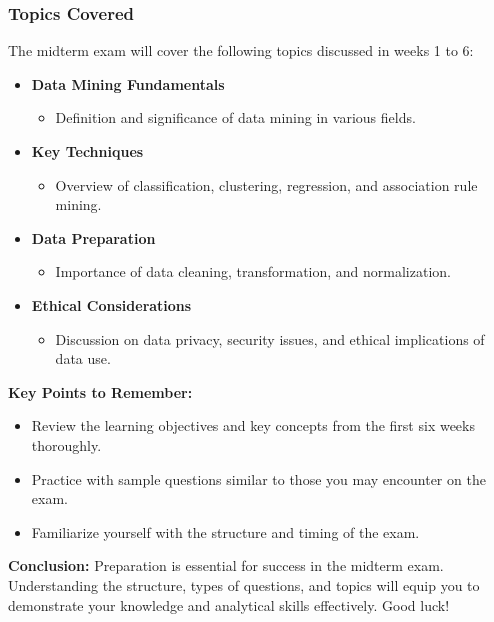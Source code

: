 \documentclass{beamer}
\begin{document}
\begin{frame}[fragile]
    \frametitle{Topics Covered}
    The midterm exam will cover the following topics discussed in weeks 1 to 6:
    \begin{itemize}
        \item \textbf{Data Mining Fundamentals}
            \begin{itemize}
                \item Definition and significance of data mining in various fields.
            \end{itemize}
        \item \textbf{Key Techniques}
            \begin{itemize}
                \item Overview of classification, clustering, regression, and association rule mining.
            \end{itemize}
        \item \textbf{Data Preparation}
            \begin{itemize}
                \item Importance of data cleaning, transformation, and normalization.
            \end{itemize}
        \item \textbf{Ethical Considerations}
            \begin{itemize}
                \item Discussion on data privacy, security issues, and ethical implications of data use.
            \end{itemize}
    \end{itemize}
    
    \textbf{Key Points to Remember:}
    \begin{itemize}
        \item Review the learning objectives and key concepts from the first six weeks thoroughly.
        \item Practice with sample questions similar to those you may encounter on the exam.
        \item Familiarize yourself with the structure and timing of the exam.
    \end{itemize}

    \textbf{Conclusion:} Preparation is essential for success in the midterm exam. Understanding the structure, types of questions, and topics will equip you to demonstrate your knowledge and analytical skills effectively. Good luck!
\end{frame}
\end{document}

